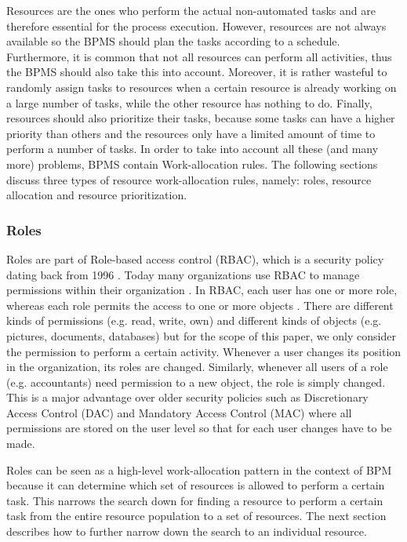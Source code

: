 Resources are the ones who perform the actual non-automated tasks and are therefore essential for the process execution. However, resources are not always available so the BPMS should plan the tasks according to a schedule. Furthermore, it is common that not all resources can perform all activities, thus the BPMS should also take this into account. Moreover, it is rather wasteful to randomly assign tasks to resources when a certain resource is already working on a large number of tasks, while the other resource has nothing to do. Finally, resources should also prioritize their tasks, because some tasks can have a higher priority than others and the resources only have a limited amount of time to perform a number of tasks. In order to take into account all these (and many more) problems, BPMS contain Work-allocation rules. The following sections discuss three types of resource work-allocation rules, namely: roles, resource allocation and resource prioritization.

\subsubsection{Roles}
Roles are part of Role-based access control (RBAC), which is a security policy dating back from 1996 \cite{rbac}. Today many organizations use RBAC to manage permissions within their organization \cite{rbac2,rbac}. In RBAC, each user has one or more role, whereas each role permits the access to one or more objects \cite{rbac2,rbac}. There are different kinds of permissions (e.g. read, write, own) and different kinds of objects (e.g. pictures, documents, databases) but for the scope of this paper, we only consider the permission to perform a certain activity. Whenever a user changes its position in the organization, its roles are changed. Similarly, whenever all users of a role (e.g. accountants) need permission to a new object, the role is simply changed. This is a major advantage over older security policies such as Discretionary Access Control (DAC) \cite{dac} and Mandatory Access Control (MAC) \cite{mac} where all permissions are stored on the user level so that for each user changes have to be made. 

Roles can be seen as a high-level work-allocation pattern in the context of BPM because it can determine which set of resources is allowed to perform a certain task. This narrows the search down for finding a resource to perform a certain task from the entire resource population to a set of resources. The next section describes how to further narrow down the search to an individual resource.

